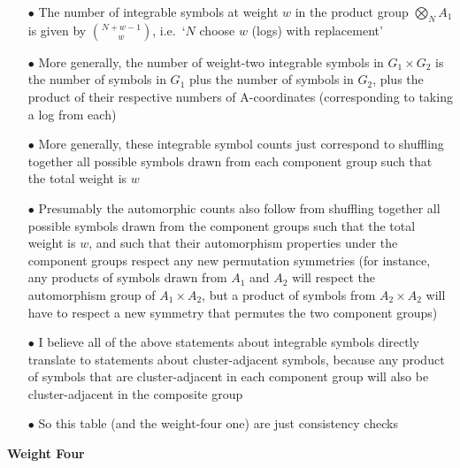 \documentclass[12pt]{article}
\begin{document}
\begin{center}
\begin{enumerate}
\item[$\bullet$] The number of integrable symbols at weight $w$ in the product group $\bigotimes_N A_1$ is given by $\binom{N+w-1}{w}$, i.e.\ `$N$ choose $w$ (logs) with replacement' 
\item[$\bullet$] More generally, the number of weight-two integrable symbols in $G_1 \times G_2$ is the number of symbols in $G_1$ plus the number of symbols in $G_2$, plus the product of their respective numbers of A-coordinates (corresponding to taking a log from each)
\item[$\bullet$] More generally, these integrable symbol counts just correspond to shuffling together all possible symbols drawn from each component group such that the total weight is $w$
\item[$\bullet$] Presumably the automorphic counts also follow from shuffling together all possible symbols drawn from the component groups such that the total weight is $w$, and such that their automorphism properties under the component groups respect any new permutation symmetries (for instance, any products of symbols drawn from $A_1$ and $A_2$ will respect the automorphism group of $A_1 \times A_2$, but a product of symbols from $A_2 \times A_2$ will have to respect a new symmetry that permutes the two component groups)
\item[$\bullet$] I believe all of the above statements about integrable symbols directly translate to statements about cluster-adjacent symbols, because any product of symbols that are cluster-adjacent in each component group will also be cluster-adjacent in the composite group
\item[$\bullet$] So this table (and the weight-four one) are just consistency checks
\end{enumerate}


\newpage

{\bf Weight Four}


\end{center}
\end{document}
